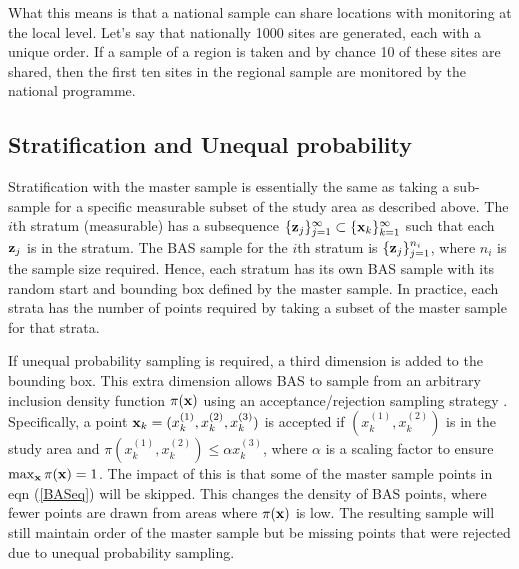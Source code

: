 \documentclass[titlepage]{article}
\begin{document}
What this means is that a national sample can share locations with monitoring at the local level. Let's say that nationally 1000 sites are generated, each with a unique order. If a sample of a region is taken and by chance 10 of these sites are shared, then the first ten sites in the regional sample are monitored by the national programme.

\subsection{Stratification and Unequal probability}
Stratification with the master sample is essentially the same as taking a sub-sample for a specific measurable subset of the study area as described above. The $i$th stratum (measurable) has a subsequence $\{{\bf z}_j\}_{j=1}^{\infty} \subset \{{\bf x}_k\}_{k=1}^{\infty}$ such that each ${\bf z}_j$ is in the stratum. The BAS sample for the $i$th stratum is $\{{\bf z}_j\}_{j=1}^{n_i}$, where $n_i$ is the sample size required. Hence, each stratum has its own BAS sample with its random start and bounding box defined by the master sample. In practice, each strata has the number of points required by taking a subset of the master sample for that strata.

If unequal probability sampling is required, a third dimension is added to the bounding box. This extra dimension allows BAS to sample from an arbitrary inclusion density function $\pi(\bf{x})$ using an acceptance/rejection sampling strategy \citep{Robertson2013}. Specifically, a point ${\bf x}_k = (x_k^{(1)}, x_k^{(2)}, x_k^{(3)})$ is accepted if $(x_k^{(1)}, x_k^{(2)})$ is in the study area and $\pi(x_k^{(1)}, x_k^{(2)}) \leq \alpha x_k^{(3)}$, where $\alpha$ is a scaling factor to ensure $\max_{{\bf x}}\pi({\bf x}) = 1$. The impact of this is that some of the master sample points in eqn (\ref{BASeq}) will be skipped. This changes the density of BAS points, where fewer points are drawn from areas where $\pi({\bf x})$ is low. The resulting sample will still maintain order of the master sample but be missing points that were rejected due to unequal probability sampling.
\end{document}
